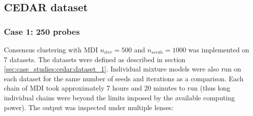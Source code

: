 \documentclass[12pt]{article} %
\begin{document}

	\subsection{CEDAR dataset} \label{sec:results:cedar}
	\subsubsection{Case 1: 250 probes} \label{sec:results:cedar:dataset_1}
	Consensus clustering with MDI $n_{iter}=500$ and $n_{seeds}=1000$ was implemented on 7 datasets. The datasets were defined as described in section \ref{sec:case_studies:cedar:dataset_1}. Individual mixture models were also run on each dataset for the same number of seeds and iterations as a comparison. Each chain of MDI took approximately 7 hours and 20 minutes to run (thus long individual chains were beyond the limits imposed by the available computing power). The output was inspected under multiple lenses: 
	
\end{document}
